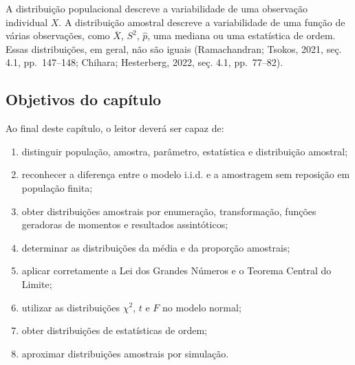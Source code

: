 \documentclass[
  letterpaper,
  DIV=11,
  numbers=noendperiod]{scrreprt}
\providecommand{\tightlist}{%
  \setlength{\itemsep}{0pt}\setlength{\parskip}{0pt}}\usepackage{longtable,booktabs,array}
\begin{document}
\begin{tcolorbox}[enhanced jigsaw, colback=white, leftrule=.75mm, colbacktitle=quarto-callout-note-color!10!white, breakable, titlerule=0mm, bottomtitle=1mm, title=\textcolor{quarto-callout-note-color}{\faInfo}\hspace{0.5em}{Interpretação}, colframe=quarto-callout-note-color-frame, toprule=.15mm, opacityback=0, bottomrule=.15mm, opacitybacktitle=0.6, arc=.35mm, toptitle=1mm, rightrule=.15mm, coltitle=black, left=2mm]

A distribuição populacional descreve a variabilidade de uma observação
individual \(X\). A distribuição amostral descreve a variabilidade de
uma função de várias observações, como \(\overline{X}\), \(S^2\),
\(\widehat p\), uma mediana ou uma estatística de ordem. Essas
distribuições, em geral, não são iguais (Ramachandran; Tsokos, 2021,
seç. 4.1, pp.~147--148; Chihara; Hesterberg, 2022, seç. 4.1,
pp.~77--82).

\end{tcolorbox}

\subsection*{Objetivos do capítulo}\label{objetivos-do-capuxedtulo}

Ao final deste capítulo, o leitor deverá ser capaz de:

\begin{enumerate}
\def\labelenumi{\arabic{enumi}.}
\tightlist
\item
  distinguir população, amostra, parâmetro, estatística e distribuição
  amostral;
\item
  reconhecer a diferença entre o modelo i.i.d. e a amostragem sem
  reposição em população finita;
\item
  obter distribuições amostrais por enumeração, transformação, funções
  geradoras de momentos e resultados assintóticos;
\item
  determinar as distribuições da média e da proporção amostrais;
\item
  aplicar corretamente a Lei dos Grandes Números e o Teorema Central do
  Limite;
\item
  utilizar as distribuições \(\chi^2\), \(t\) e \(F\) no modelo normal;
\item
  obter distribuições de estatísticas de ordem;
\item
  aproximar distribuições amostrais por simulação.
\end{enumerate}
\end{document}
